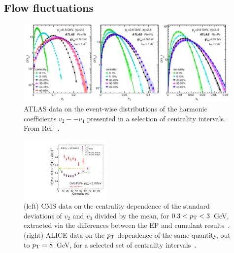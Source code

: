 \subsection{Flow fluctuations}
\begin{figure}[!tb]
\begin{center}
\includegraphics[width=0.98\textwidth]{flowcorrelations_figs/atlas_v2fluc_fig_10.pdf}
\caption[]{
ATLAS data on the event-wise distributions of the harmonic coefficients $v_2 -- v_4$ presented in a selection of
centrality intervals.  From Ref.~\cite{Aad:2013xma}.
}
\label{fig:pas:fc:flowfluc1}
\end{center}
\end{figure}

\begin{figure}[!tb]
\begin{center}
\includegraphics[width=0.40\textwidth]{flowcorrelations_figs/vnSigmaPrelim.pdf}
\caption[]{
(left) CMS data on the centrality dependence of the standard deviations of $v_2$ and $v_3$
divided by the mean, for $0.3 < \mbox{$p_{\mathrm{T}}$} < 3$~GeV,
extracted via the differences between the EP and cumulant results~\cite{Chatrchyan:2013kba}.
(right) ALICE data on the $\mbox{$p_{\mathrm{T}}$}$ dependence of the same quantity, out to $\mbox{$p_{\mathrm{T}}$}=8$~GeV,
for a selected set of centrality
intervals~\cite{Abelev:2012di}.
}
\label{fig:pas:fc:flowfluc2}
\end{center}
\end{figure}

